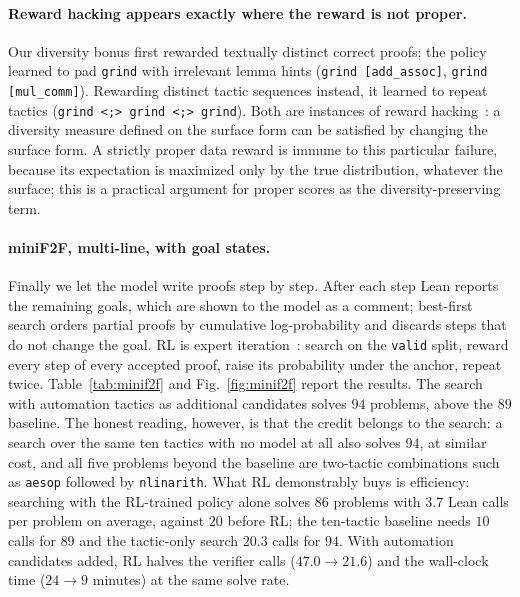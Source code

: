 \documentclass[11pt]{article}
\theoremstyle{definition}
\begin{document}
\paragraph{Reward hacking appears exactly where the reward is not proper.} Our diversity bonus first rewarded textually distinct correct proofs; the policy learned to pad \texttt{grind} with irrelevant lemma hints (\texttt{grind [add\_assoc]}, \texttt{grind [mul\_comm]}). Rewarding distinct tactic sequences instead, it learned to repeat tactics (\texttt{grind <;> grind <;> grind}). Both are instances of reward hacking~\cite{skalse2022hacking}: a diversity measure defined on the surface form can be satisfied by changing the surface form. A strictly proper data reward is immune to this particular failure, because its expectation is maximized only by the true distribution, whatever the surface; this is a practical argument for proper scores as the diversity-preserving term.

\paragraph{miniF2F, multi-line, with goal states.} Finally we let the model write proofs step by step. After each step Lean reports the remaining goals, which are shown to the model as a comment; best-first search orders partial proofs by cumulative log-probability and discards steps that do not change the goal. RL is expert iteration~\cite{anthony2017exit,polu2023curriculum}: search on the \texttt{valid} split, reward every step of every accepted proof, raise its probability under the anchor, repeat twice. Table~\ref{tab:minif2f} and Fig.~\ref{fig:minif2f} report the results. The search with automation tactics as additional candidates solves $94$ problems, above the $89$ baseline. The honest reading, however, is that the credit belongs to the search: a search over the same ten tactics with no model at all also solves $94$, at similar cost, and all five problems beyond the baseline are two-tactic combinations such as \texttt{aesop} followed by \texttt{nlinarith}. What RL demonstrably buys is efficiency: searching with the RL-trained policy alone solves $86$ problems with $3.7$ Lean calls per problem on average, against $20$ before RL; the ten-tactic baseline needs $10$ calls for $89$ and the tactic-only search $20.3$ calls for $94$. With automation candidates added, RL halves the verifier calls ($47.0\to21.6$) and the wall-clock time ($24\to9$ minutes) at the same solve rate.
\end{document}
